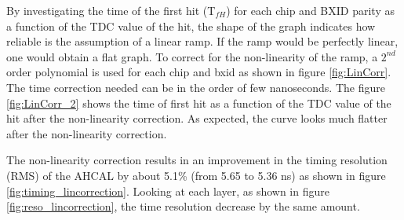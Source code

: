 By investigating the time of the first hit (T$_{fH}$) for each chip and BXID parity as a function of the TDC value of the hit, the shape of the graph indicates how reliable is the assumption of a linear ramp. If the ramp would be perfectly linear, one would obtain a flat graph. To correct for the non-linearity of the ramp, a $2^{nd}$ order polynomial is used for each chip and \acrshort{bxid} as shown in figure \ref{fig:LinCorr}. The time correction needed can be in the order of few nanoseconds. The figure \ref{fig:LinCorr_2} shows the time of first hit as a function of the TDC value of the hit after the non-linearity correction. As expected, the curve looks much flatter after the non-linearity correction.

The non-linearity correction results in an improvement in the timing resolution (RMS) of the AHCAL by about 5.1\% (from 5.65 to 5.36 ns) as shown in figure \ref{fig:timing_lincorrection}. Looking at each layer, as shown in figure \ref{fig:reso_lincorrection}, the time resolution decrease by the same amount.

